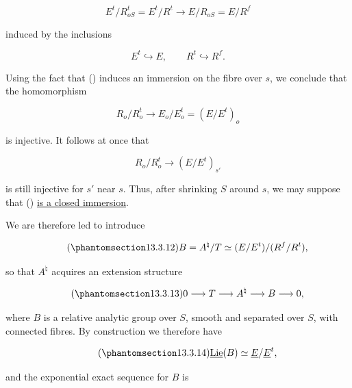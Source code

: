 \begin{equation*}
 E^t/R_{oS}^t=E^t/R^t\longrightarrow E/R_{oS}=E/R^f
\end{equation*}

\noindent
induced by the inclusions

\begin{equation*}
 E^t\hookrightarrow E,
 \qquad R^t\hookrightarrow R^f.
\end{equation*}

\noindent
Using the fact that () induces an immersion on the fibre over $s$,
we conclude that the homomorphism

\begin{equation*}
 R_o/R_o^t\longrightarrow E_o/E_o^t=(E/E^t)_o
\end{equation*}

\noindent
is injective. It follows at once that

\begin{equation*}
 R_o/R_o^t\longrightarrow(E/E^t)_{s'}
\end{equation*}

\noindent
is still injective for $s'$ near $s$. Thus, after shrinking $S$ around
$s$, we may suppose that () \underline{is a closed immersion}.

We are therefore led to introduce

\begin{equation}\tag{\SGARefTarget{sga7.sga7i.eix.n13-3-12}{13.3.12}}
 B=A^\natural/T\simeq(E/E^t)/(R^f/R^t),
\end{equation}

\noindent
so that $A^\natural$ acquires an extension structure

\begin{equation}\tag{\SGARefTarget{sga7.sga7i.eix.n13-3-13}{13.3.13}}
 0\longrightarrow T\longrightarrow A^\natural
 \longrightarrow B\longrightarrow0,
\end{equation}

\noindent
where $B$ is a relative analytic group over $S$, smooth and separated
over $S$, with connected fibres. By construction we therefore have

\begin{equation}\tag{\SGARefTarget{sga7.sga7i.eix.n13-3-14}{13.3.14}}
 \underline{\operatorname{Lie}}(B)\simeq
 \underline E/\underline E^t,
\end{equation}

\noindent
and the exponential exact sequence for $B$ is

